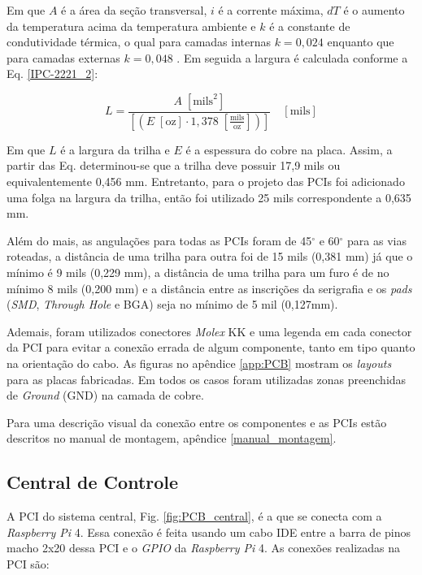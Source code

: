 Em que $A$ é a área da seção transversal, $i$ é a corrente máxima, $dT$ é o aumento da temperatura acima da temperatura ambiente e $k$ é a constante de condutividade térmica, o qual para camadas internas $k=0,024$ enquanto que para camadas externas $k=0,048$ \cite{IPC}. Em seguida a largura é calculada conforme a Eq. \ref{IPC-2221_2}:

\begin{equation}\label{IPC-2221_2}
    L = \frac{A \; [\text{mils}^2]}{\left[(E \; [\text{oz}] \cdot 1,378 \; [\frac{\text{mils}}{\text{oz}}])\right]} \quad [\text{mils}]
\end{equation}

Em que $L$ é a largura da trilha e $E$ é a espessura do cobre na placa. Assim, a partir das Eq. determinou-se que a trilha deve possuir 17,9 mils ou equivalentemente 0,456 mm. Entretanto, para o projeto das PCIs foi adicionado uma folga na largura da trilha, então foi utilizado 25 mils correspondente a 0,635 mm.

Além do mais, as angulações para todas as PCIs foram de 45$^\circ$ e 60$^\circ$ para as vias roteadas, a distância de uma trilha para outra foi de 15 mils (0,381 mm) já que o mínimo é 9 mils (0,229 mm), a distância de uma trilha para um furo é de no mínimo 8 mils (0,200 mm) e a distância entre as inscrições da serigrafia e os \textit{pads} (\textit{SMD}, \textit{Through Hole} e BGA) seja no mínimo de 5 mil (0,127mm).

Ademais, foram utilizados conectores \textit{Molex} KK e uma legenda em cada conector da PCI para evitar a conexão errada de algum componente, tanto em tipo quanto na orientação do cabo. As figuras no apêndice \ref{app:PCB} mostram os \textit{layouts} para as placas fabricadas. Em todos os casos foram utilizadas zonas preenchidas de \textit{Ground} (GND) na camada de cobre.

Para uma descrição visual da conexão entre os componentes e as PCIs estão descritos no manual de montagem, apêndice \ref{manual_montagem}.

\subsection{Central de Controle}

A PCI do sistema central, Fig. \ref{fig:PCB_central}, é a que se conecta com a \textit{Raspberry Pi} 4. Essa conexão é feita usando um cabo IDE entre a barra de pinos macho 2x20 dessa PCI e o \textit{GPIO} da \textit{Raspberry Pi} 4. As conexões realizadas na PCI são:

